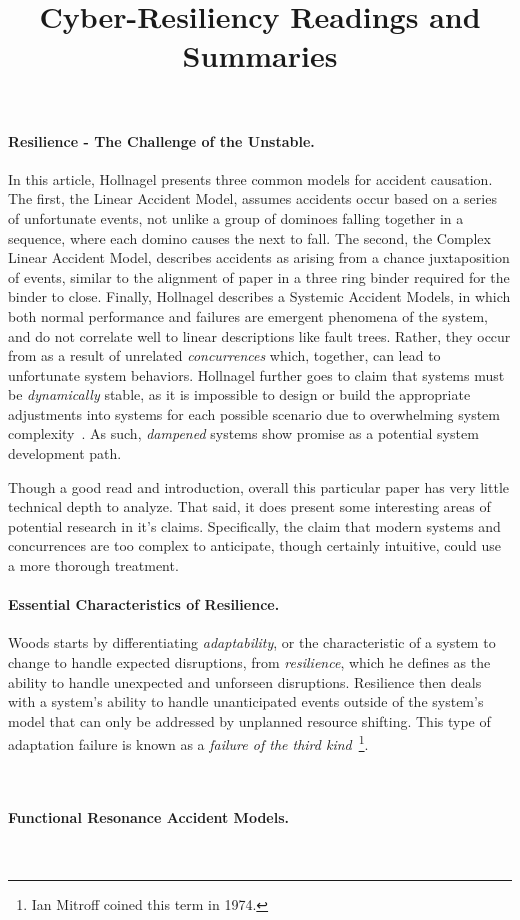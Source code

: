 \documentclass[10pt,letterpaper]{article}
\title{Cyber-Resiliency Readings and Summaries}
\author{}
\begin{document}
\maketitle
\paragraph{Resilience - The Challenge of the Unstable.} In this article, Hollnagel presents three common models for accident causation.  The first, the Linear Accident Model, assumes accidents occur based on a series of unfortunate events, not unlike a group of dominoes falling together in a sequence, where each domino causes the next to fall. The second, the Complex Linear Accident Model, describes accidents as arising from a chance juxtaposition of events, similar to the alignment of paper in a three ring binder required for the binder to close.  Finally, Hollnagel describes a Systemic Accident Models, in which both normal performance and failures are emergent phenomena of the system, and do not correlate well to linear descriptions like fault trees.  Rather, they occur from as a result of unrelated {\sl concurrences} which, together, can lead to unfortunate system behaviors.  Hollnagel further goes to claim that systems must be {\sl dynamically} stable, as it is impossible to design or build the appropriate adjustments into systems for each possible scenario due to overwhelming system complexity~\cite{Ho:04}.  As such, {\sl dampened} systems show promise as a potential system development path.~\cite{Ho:06}

Though a good read and introduction, overall this particular paper has very little technical depth to analyze.  That said, it does present some interesting areas of potential research in it's claims.  Specifically, the claim that modern systems and concurrences are too complex to anticipate, though certainly intuitive, could use a more thorough treatment.

\paragraph{Essential Characteristics of Resilience.} Woods starts by differentiating {\sl adaptability}, or the characteristic of a system to change to handle expected disruptions, from {\sl resilience}, which he defines as the ability to handle unexpected and unforseen disruptions.  Resilience then deals with a system's ability to handle unanticipated events outside of the system's model that can only be addressed by unplanned resource shifting.  This type of adaptation failure is known as a {\sl failure of the third kind}~\footnote{Ian Mitroff coined this term in 1974.}.

~\cite{Wo:06}

\paragraph{Functional Resonance Accident Models.}

~\cite{Ho:04}

\printbibliography
\end{document}
